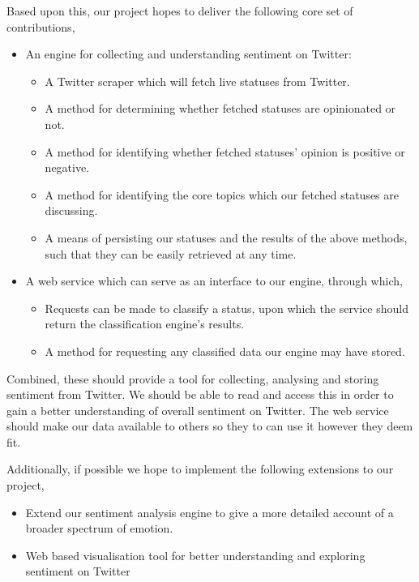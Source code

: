 Based upon this, our project hopes to deliver the following core set of contributions,
\begin{itemize}
\item An engine for collecting and understanding sentiment on Twitter:
	\begin{itemize}
		\item A Twitter scraper which will fetch live statuses from Twitter.
		\item A method for determining whether fetched statuses are opinionated or not.
		\item A method for identifying whether fetched statuses' opinion is positive or negative.
		\item A method for identifying the core topics which our fetched statuses are discussing.
		\item A means of persisting our statuses and the results of the above methods, such that they can be easily retrieved at any time.
	\end{itemize}
\item A web service which can serve as an interface to our engine, through which,
	\begin{itemize}
		\item Requests can be made to classify a status, upon which the service should return the classification engine's results.
		\item A method for requesting any classified data our engine may have stored.
	\end{itemize}	
\end{itemize}

Combined, these should provide a tool for collecting, analysing and storing sentiment from Twitter. We should be able to read and access this in order to gain a better understanding of overall sentiment on Twitter. The web service should make our data available to others so they to can use it however they deem fit.

Additionally, if possible we hope to implement the following extensions to our project,
\begin{itemize}
	\item Extend our sentiment analysis engine to give a more detailed account of a broader spectrum of emotion.
	\item Web based visualisation tool for better understanding and exploring sentiment on Twitter
\end{itemize}